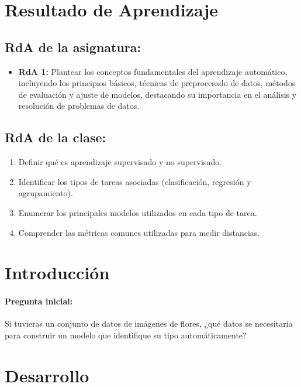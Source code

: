 \documentclass[a4,11pt]{aleph-notas}
\begin{document}
\encabezado

\section*{Resultado de Aprendizaje}

\subsection*{RdA de la asignatura:}
\begin{itemize}[leftmargin=*]
    \item \textbf{RdA 1:} 
    Plantear los conceptos fundamentales del aprendizaje automático, incluyendo los principios básicos, técnicas de preprocesado de datos, métodos de evaluación y ajuste de modelos, destacando su importancia en el análisis y resolución de problemas de datos.
\end{itemize}

\subsection*{RdA de la clase:}
\begin{enumerate}[leftmargin=*]
    \item Definir qué es aprendizaje supervisado y no supervisado.
    \item Identificar los tipos de tareas asociadas (clasificación, regresión y agrupamiento).
    \item Enumerar los principales modelos utilizados en cada tipo de tarea.
    \item Comprender las métricas comunes utilizadas para medir distancias.
\end{enumerate}


\section*{Introducción}

\paragraph{Pregunta inicial:}  
Si tuvieras un conjunto de datos de imágenes de flores, ¿qué datos se necesitaría para construir un modelo que identifique su tipo automáticamente?


\section*{Desarrollo}
\end{document}
